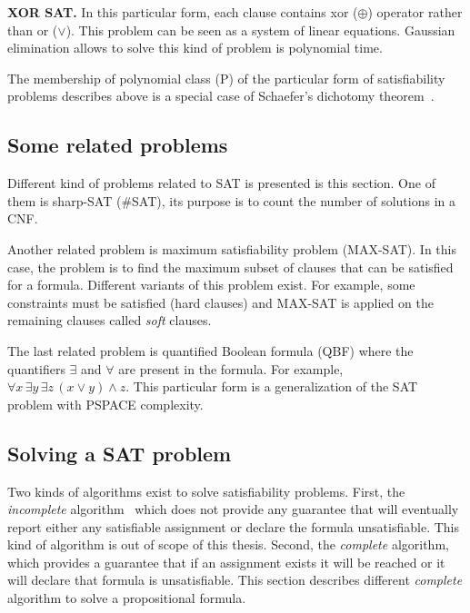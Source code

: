 \textbf{XOR SAT.} In this particular form, each clause contains xor ($\oplus$) operator rather than or ($\lor$).
This problem can be seen as a system of linear equations. Gaussian elimination allows to solve this kind of
problem is polynomial time.

The membership of polynomial class (P) of the particular form of satisfiability problems describes above is a special case of Schaefer's dichotomy theorem~\cite{schaefer1978complexity}.

\subsection{Some related problems}

Different kind of problems related to SAT is presented is this section.
One of them is sharp-SAT (\#SAT), its purpose is to count the number of solutions in a CNF.


Another related problem is maximum satisfiability problem (MAX-SAT). In this case, the problem
is to find the maximum subset of clauses that can be satisfied for a formula. Different variants
of this problem exist. For example, some constraints must be satisfied (hard clauses) and MAX-SAT
is applied on the remaining clauses called \emph{soft} clauses.

The last related problem is quantified Boolean formula (QBF) where the quantifiers $\exists$ and
$\forall$ are present in the formula. For example, $\forall x\, \exists y\, \exists z \, (x \lor y) \land z$.
This particular form is a generalization of the SAT problem with PSPACE complexity.

\subsection{Solving a SAT problem}
Two kinds of algorithms exist to solve satisfiability problems.
First, the \emph{incomplete} algorithm~\cite{kautz2009incomplete} which does not provide any guarantee that will eventually report either any satisfiable assignment or declare the formula unsatisfiable. This kind of algorithm is out of scope of this thesis. 
Second, the \emph{complete} algorithm, which provides a guarantee that if an assignment exists
it will be reached or it will declare that formula is unsatisfiable.
This section describes different \emph{complete }algorithm to solve a propositional formula.

